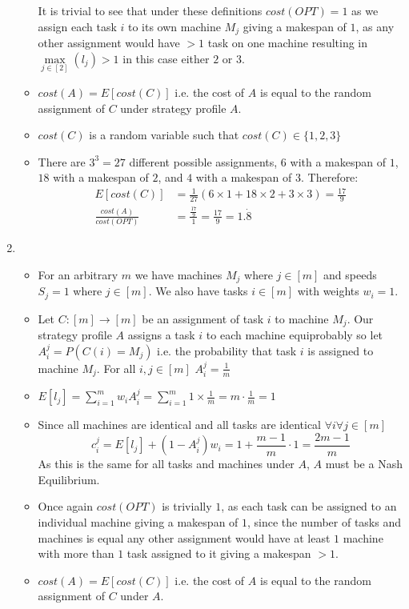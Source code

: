 \documentclass[]{article}
\begin{document}
\begin{enumerate}
\begin{itemize}
		It is trivial to see that under these definitions $cost(OPT)=1$ as we assign each task $i$ to its own machine $M_j$ giving a makespan of $1$, as any other assignment would have $>1$ task on one machine resulting in $\max\limits_{j\in[2]}(l_j)>1$ in this case either $2$ or $3$.
		\item
		$cost(A)=E[cost(C)]$ i.e. the cost of $A$ is equal to the random assignment of $C$ under strategy profile $A$.
		\item
		$cost(C)$ is a random variable such that $cost(C)\in\{1,2,3\}$
		\item
		There are $3^3=27$ different possible assignments, $6$ with a makespan of $1$, $18$ with a makespan of $2$, and $4$ with a makespan of $3$. Therefore:
		\begin{align*}
			E[cost(C)]&=\frac{1}{27}(6\times1+18\times2+3\times3)=\frac{17}{9} \\
			\frac{cost(A)}{cost(OPT)}&=\frac{\frac{17}{9}}{1}=\frac{17}{9}=1.\dot{8}
		\end{align*}
	\end{itemize}
	\item ~
	\begin{itemize}
		\item
		For an arbitrary $m$ we have machines $M_j$ where $j\in[m]$ and speeds $S_j=1$ where $j\in[m]$. We also have tasks $i\in[m]$ with weights $w_i=1$.
		\item
		Let $C:[m]\rightarrow[m]$ be an assignment of task $i$ to machine $M_j$. Our strategy profile $A$ assigns a task $i$ to each machine equiprobably so let $A_i^j=P(C(i)=M_j)$ i.e. the probability that task $i$ is assigned to machine $M_j$. For all $i,j\in[m]$ $A_i^j=\frac{1}{m}$
		\item
		$E[l_j]=\sum_{i=1}^{m}w_iA_i^j=\sum_{i=1}^{m}1\times\frac{1}{m}=m\cdot\frac{1}{m}=1$
		\item
		Since all machines are identical and all tasks are identical $\forall i \forall j \in[m]$
		\[
			c_i^j=E[l_j]+(1-A_i^j)w_i=1+\frac{m-1}{m}\cdot1=\frac{2m-1}{m}
		\]
		As this is the same for all tasks and machines under $A$, $A$ must be a Nash Equilibrium.
		\item
		Once again $cost(OPT)$ is trivially $1$, as each task can be assigned to an individual machine giving a makespan of $1$, since the number of tasks and machines is equal any other assignment would have at least $1$ machine with more than $1$ task assigned to it giving a makespan $>1$.
		\item
		$cost(A)=E[cost(C)]$ i.e. the cost of $A$ is equal to the random assignment of $C$ under $A$.

\end{itemize}
\end{enumerate}
\end{document}
